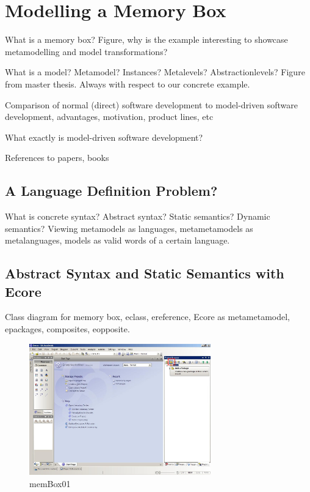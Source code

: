 \chapter{Modelling a Memory Box}
\label{chap:membox}

What is a memory box?  Figure, why is the example interesting to showcase
metamodelling and model transformations?

What is a model? Metamodel? Instances? Metalevels? Abstractionlevels? Figure
from master thesis.  Always with respect to our concrete example.

Comparison of normal (direct) software development to model-driven software
development, advantages, motivation, product lines, etc

What exactly is model-driven software development?

References to papers, books

\section*{A Language Definition Problem?}

What is concrete syntax?  Abstract syntax?  Static semantics?  Dynamic
semantics?  Viewing metamodels as languages, metametamodels as metalanguages,
models as valid words of a certain language.

\section*{Abstract Syntax and Static Semantics with Ecore}

Class diagram for memory box, eclass, ereference, Ecore as metametamodel,
epackages, composites, eopposite.

\begin{figure}[htbp]
	\centering
  \includegraphics[width=0.7\textwidth]{pics/memBox01.png}
	\caption{memBox01}
	\label{memBox01}
\end{figure}

